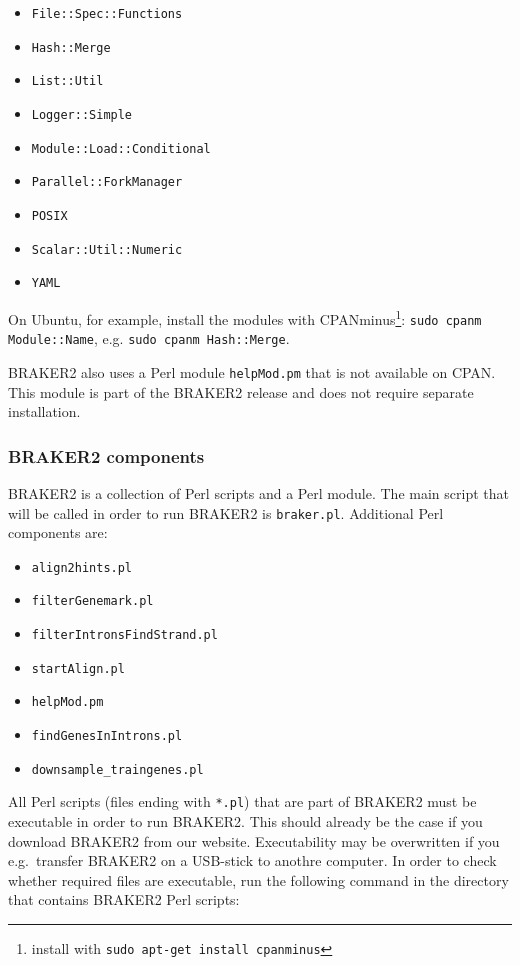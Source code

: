 \documentclass[]{article}
\begin{document}
\begin{itemize}
\item
  \texttt{File::Spec::Functions}
\item
  \texttt{Hash::Merge}
\item
  \texttt{List::Util}
\item
  \texttt{Logger::Simple}
\item
  \texttt{Module::Load::Conditional}
\item
  \texttt{Parallel::ForkManager}
\item
  \texttt{POSIX}
\item
  \texttt{Scalar::Util::Numeric}
\item
  \texttt{YAML}
\end{itemize}

On Ubuntu, for example, install the modules with CPANminus\footnote{install
  with \texttt{sudo apt-get install cpanminus}}:
\texttt{sudo cpanm Module::Name}, e.g.
\texttt{sudo cpanm Hash::Merge}.

BRAKER2 also uses a Perl module \texttt{helpMod.pm} that is not
available on CPAN. This module is part of the BRAKER2 release and does
not require separate installation.

\subsubsection{BRAKER2 components}\label{Executability}

BRAKER2 is a collection of Perl scripts and a Perl module. The main
script that will be called in order to run BRAKER2 is
\texttt{braker.pl}. Additional Perl components are:

\begin{itemize}
\item
  \texttt{align2hints.pl}
\item
  \texttt{filterGenemark.pl}
\item
  \texttt{filterIntronsFindStrand.pl}
\item
  \texttt{startAlign.pl}
\item
  \texttt{helpMod.pm}
\item
  \texttt{findGenesInIntrons.pl}
\item
  \texttt{downsample\_traingenes.pl}
\end{itemize}

All Perl scripts (files ending with \texttt{*.pl}) that are part of
BRAKER2 must be executable in order to run BRAKER2. This should already
be the case if you download BRAKER2 from our website. Executability may
be overwritten if you e.g.~transfer BRAKER2 on a USB-stick to anothre
computer. In order to check whether required files are executable, run
the following command in the directory that contains BRAKER2 Perl
scripts:
\end{document}
